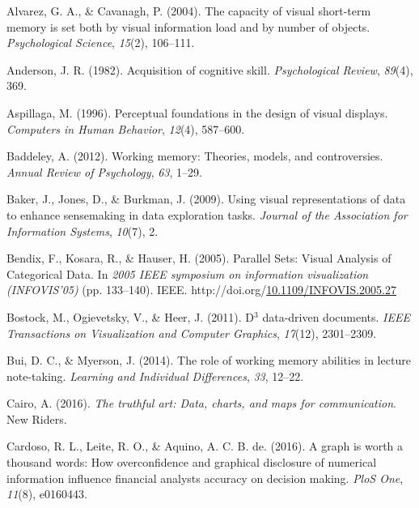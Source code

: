 \documentclass[print]{nuthesis}
\newlength{\cslhangindent}
\newenvironment{CSLReferences}[2]%
{\setlength{\parindent}{0pt}%
\everypar{\setlength{\hangindent}{\cslhangindent}}\ignorespaces}%
{\par}
\begin{document}
\hypertarget{refs}{}
\begin{CSLReferences}{1}{0}
\leavevmode{}%
Alvarez, G. A., \& Cavanagh, P. (2004). The capacity of visual short-term memory is set both by visual information load and by number of objects. \emph{Psychological Science}, \emph{15}(2), 106--111.

\leavevmode{}%
Anderson, J. R. (1982). Acquisition of cognitive skill. \emph{Psychological Review}, \emph{89}(4), 369.

\leavevmode{}%
Aspillaga, M. (1996). Perceptual foundations in the design of visual displays. \emph{Computers in Human Behavior}, \emph{12}(4), 587--600.

\leavevmode{}%
Baddeley, A. (2012). Working memory: Theories, models, and controversies. \emph{Annual Review of Psychology}, \emph{63}, 1--29.

\leavevmode{}%
Baker, J., Jones, D., \& Burkman, J. (2009). Using visual representations of data to enhance sensemaking in data exploration tasks. \emph{Journal of the Association for Information Systems}, \emph{10}(7), 2.

\leavevmode{}%
Bendix, F., Kosara, R., \& Hauser, H. (2005). {Parallel Sets: Visual Analysis of Categorical Data}. In \emph{2005 IEEE symposium on information visualization (INFOVIS'05)} (pp. 133--140). IEEE. http://doi.org/\href{https://doi.org/10.1109/INFOVIS.2005.27}{10.1109/INFOVIS.2005.27}

\leavevmode{}%
Bostock, M., Ogievetsky, V., \& Heer, J. (2011). D\(^3\) data-driven documents. \emph{IEEE Transactions on Visualization and Computer Graphics}, \emph{17}(12), 2301--2309.

\leavevmode{}%
Bui, D. C., \& Myerson, J. (2014). The role of working memory abilities in lecture note-taking. \emph{Learning and Individual Differences}, \emph{33}, 12--22.

\leavevmode{}%
Cairo, A. (2016). \emph{The truthful art: Data, charts, and maps for communication}. New Riders.

\leavevmode{}%
Cardoso, R. L., Leite, R. O., \& Aquino, A. C. B. de. (2016). A graph is worth a thousand words: How overconfidence and graphical disclosure of numerical information influence financial analysts accuracy on decision making. \emph{PloS One}, \emph{11}(8), e0160443.


\end{CSLReferences}
\end{document}
